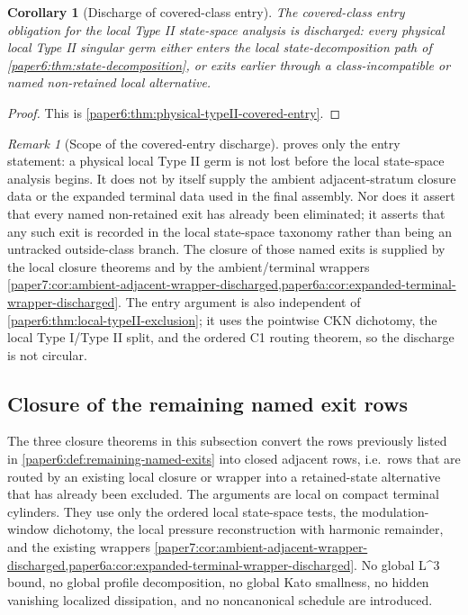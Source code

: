 \documentclass[11pt]{amsart}
\def\({}%
\def\){}%
\theoremstyle{plain}
\newtheorem{corollary}[corollary]{Corollary}
\theoremstyle{definition}
\theoremstyle{remark}
\newtheorem{remark}[remark]{Remark}
\begin{document}
\begin{corollary}[Discharge of covered-class entry]
\label{paper6:cor:covered-class-entry-discharged}
The covered-class entry obligation for the local Type II state-space analysis is
discharged:
every physical local Type II singular germ either enters the local
state-decomposition path of \cref{paper6:thm:state-decomposition}, or exits
earlier through a class-incompatible or named non-retained local alternative.
\end{corollary}

\begin{proof}
This is \cref{paper6:thm:physical-typeII-covered-entry}.
\end{proof}

\begin{remark}[Scope of the covered-entry discharge]
\label{paper6:rem:covered-entry-scope}
 proves only the entry
statement: a physical local Type II germ is not lost before the local
state-space analysis begins.  It does not by itself supply the ambient
adjacent-stratum closure data or the expanded terminal data used in
the final assembly.  Nor does it assert that every named non-retained exit has
already been eliminated; it asserts that any such exit is recorded in the local
state-space taxonomy rather than being an untracked outside-class branch.  The
closure of those named exits is supplied by the local closure theorems and by
the ambient/terminal wrappers
\cref{paper7:cor:ambient-adjacent-wrapper-discharged,paper6a:cor:expanded-terminal-wrapper-discharged}.
The entry argument is also independent of
\cref{paper6:thm:local-typeII-exclusion}; it uses the pointwise CKN dichotomy,
the local Type I/Type II split, and the ordered C1 routing theorem, so the
discharge is not circular.
\end{remark}

\subsection{Closure of the remaining named exit rows}
\label{paper6:subsec:remaining-exit-closures}

The three closure theorems in this subsection convert the rows previously
listed in \cref{paper6:def:remaining-named-exits} into closed adjacent rows,
i.e.\ rows that are routed by an existing local closure or wrapper into a
retained-state alternative that has already been excluded.  The arguments are
local on compact terminal cylinders.  They use only the ordered local
state-space tests, the modulation-window dichotomy, the local pressure
reconstruction with harmonic remainder, and the existing wrappers
\cref{paper7:cor:ambient-adjacent-wrapper-discharged,paper6a:cor:expanded-terminal-wrapper-discharged}.
No global \(L^3\) bound, no global profile decomposition, no global Kato
smallness, no hidden vanishing localized dissipation, and no noncanonical
schedule are introduced.
\end{document}
